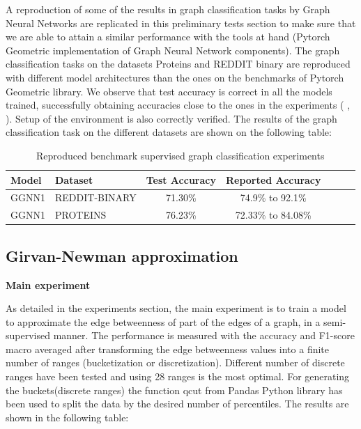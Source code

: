 A reproduction of some of the results in graph classification tasks by Graph Neural Networks are replicated in this preliminary tests section to make sure that we are able to attain a similar performance with the tools at hand (Pytorch Geometric implementation of Graph Neural Network components). The graph classification tasks on the datasets Proteins and REDDIT binary are reproduced with different model architectures than the ones on the benchmarks of Pytorch Geometric library. We observe that test accuracy is correct in all the models trained, successfully obtaining accuracies close to the ones in the experiments ( \cite{fey2019fast}, \cite{borgwardt2005protein}). Setup of the environment is also correctly verified. The results of the graph classification task on the different datasets are shown on the following table:


\begin{table}[H]
\centering
\begin{tabular}{|llcccc|c}
\hline
    Model &         Dataset &       Test Accuracy  &  Reported Accuracy  \\
\hline
  GGNN1 &   REDDIT-BINARY   &      71.30\%  &  74.9\% to 92.1\%\\
  GGNN1 &   PROTEINS        &   76.23\%  &  72.33\% to 84.08\%\\
\hline
\end{tabular}
\label{preliminar_GN}\caption{Reproduced benchmark supervised graph classification experiments }
\end{table}



\newpage
\subsection{Girvan-Newman approximation}






\textbf{Main experiment}

As detailed in the experiments section, the main experiment is to train a model to approximate the edge betweenness of part of the edges of a graph, in a semi-supervised manner. The performance is measured with the accuracy and F1-score macro averaged after transforming the edge betweenness values into a finite number of ranges (bucketization or discretization). Different number of discrete ranges have been tested and using 28 ranges is the most optimal. For generating the buckets(discrete ranges) the function qcut from Pandas Python library has been used to split the data by the desired number of percentiles. The results are shown in the following table:

